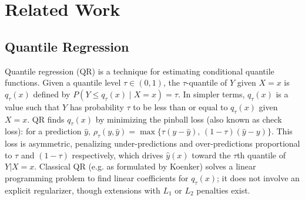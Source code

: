 \documentclass{article}
\begin{document}
\section{Related Work}

\subsection{Quantile Regression}
Quantile regression (QR) \citep{Koenker2005} is a technique for estimating conditional quantile functions. Given a quantile level $\tau \in (0,1)$, the $\tau$-quantile of $Y$ given $X=x$ is $q_{\tau}(x)$ defined by $P(Y \le q_{\tau}(x) \mid X=x) = \tau$. In simpler terms, $q_{\tau}(x)$ is a value such that $Y$ has probability $\tau$ to be less than or equal to $q_{\tau}(x)$ given $X=x$. QR finds $q_{\tau}(x)$ by minimizing the pinball loss (also known as check loss): for a prediction $\hat{y}$, $\rho_{\tau}(y, \hat{y}) = \max\{\tau (y-\hat{y}),\, (1-\tau)(\hat{y}-y)\}$. This loss is asymmetric, penalizing under-predictions and over-predictions proportional to $\tau$ and $(1-\tau)$ respectively, which drives $\hat{y}(x)$ toward the $\tau$th quantile of $Y|X=x$. Classical QR (e.g. as formulated by Koenker) solves a linear programming problem to find linear coefficients for $q_{\tau}(x)$; it does not involve an explicit regularizer, though extensions with $L_1$ or $L_2$ penalties exist.
\end{document}
